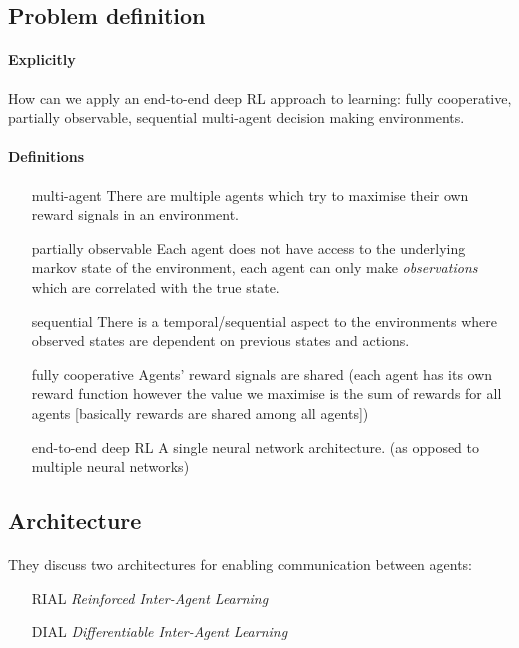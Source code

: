\documentclass{article}
\begin{document}
    \subsection{Problem definition}

    \paragraph{Explicitly} 
    How can we apply an end-to-end deep RL approach to learning:
    fully cooperative, partially observable, sequential multi-agent decision making environments.
    \paragraph{Definitions}
    \begin{enumerate}
        \item[multi-agent] There are multiple agents which try to maximise their own reward signals in an environment.
        \item[partially observable] Each agent does not have access to the underlying markov state of the environment, each agent can only make \emph{observations} which are correlated with the true state.
        \item[sequential] There is a temporal/sequential aspect to the environments where observed states are dependent on previous states and actions.
        \item[fully cooperative] Agents' reward signals are shared (each agent has its own reward function however the value we maximise is the sum of rewards for all agents [basically rewards are shared among all agents])
        \item[end-to-end deep RL] A single neural network architecture. (as opposed to multiple neural networks)
    \end{enumerate}
        
    \subsection{Architecture}

    \paragraph{} They discuss two architectures for enabling communication between agents:
    \begin{enumerate}
        \item[RIAL] \emph{Reinforced Inter-Agent Learning}
        \item[DIAL] \emph{Differentiable Inter-Agent Learning}
    \end{enumerate}
\end{document}
